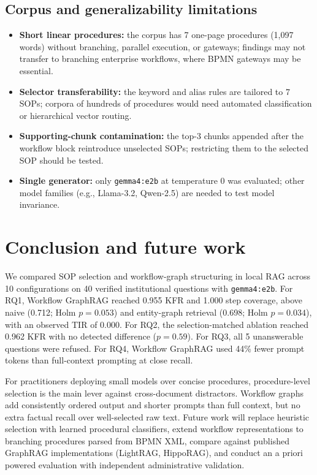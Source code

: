 \documentclass[preprint,10pt]{elsarticle}
\begin{document}
\subsection{Corpus and generalizability limitations}
\begin{itemize}[leftmargin=*]
\item \textbf{Short linear procedures:} the corpus has 7 one-page procedures (1,097 words) without branching, parallel execution, or gateways; findings may not transfer to branching enterprise workflows, where BPMN gateways may be essential.
\item \textbf{Selector transferability:} the keyword and alias rules are tailored to 7 SOPs; corpora of hundreds of procedures would need automated classification or hierarchical vector routing.
\item \textbf{Supporting-chunk contamination:} the top-3 chunks appended after the workflow block reintroduce unselected SOPs; restricting them to the selected SOP should be tested.
\item \textbf{Single generator:} only \texttt{gemma4:e2b} at temperature 0 was evaluated; other model families (e.g., Llama-3.2, Qwen-2.5) are needed to test model invariance.
\end{itemize}

\section{Conclusion and future work}
\label{sec:conclusion}

We compared SOP selection and workflow-graph structuring in local RAG across 10 configurations on 40 verified institutional questions with \texttt{gemma4:e2b}. For RQ1, Workflow GraphRAG reached 0.955 KFR and 1.000 step coverage, above naive (0.712; Holm $p=0.053$) and entity-graph retrieval (0.698; Holm $p=0.034$), with an observed TIR of 0.000. For RQ2, the selection-matched ablation reached 0.962 KFR with no detected difference ($p=0.59$). For RQ3, all 5 unanswerable questions were refused. For RQ4, Workflow GraphRAG used 44\% fewer prompt tokens than full-context prompting at close recall.

For practitioners deploying small models over concise procedures, procedure-level selection is the main lever against cross-document distractors. Workflow graphs add consistently ordered output and shorter prompts than full context, but no extra factual recall over well-selected raw text. Future work will replace heuristic selection with learned procedural classifiers, extend workflow representations to branching procedures parsed from BPMN XML, compare against published GraphRAG implementations (LightRAG, HippoRAG), and conduct an a priori powered evaluation with independent administrative validation.
\end{document}
